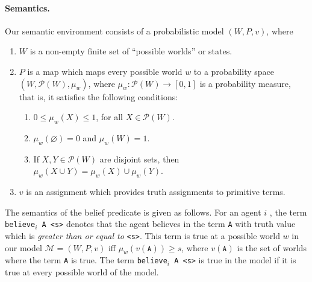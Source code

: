 \documentclass[12pt]{article}
\renewcommand{\emptyset}{\varnothing}
\begin{document}
\paragraph{Semantics.} Our semantic environment consists of a probabilistic model $(W,P,v)$, where 
\begin{enumerate}
\item
$W$ is a non-empty finite set of ``possible worlds'' or states.
\item
$P$ is a map which maps every possible world $w$ to a probability space $(W,\mathcal{P}(W),\mu_{w})$, where $\mu_{w}: \mathcal{P}(W)\to[0,1]$ is a probability measure, that is, it satisfies the following conditions:

\begin{enumerate}
\item
$0\leq \mu_{w}(X)\leq 1$, for all $X\in \mathcal{P}(W)$.
\item
$\mu_{w}(\emptyset)=0$ and $\mu_{w}(W)=1$.
\item
If $X,Y\in \mathcal{P}(W)$ are disjoint sets, then $\mu_{w}(X\cup Y)=\mu_{w}(X)\cup\mu_{w}(Y)$. 
\end{enumerate}
\item
$v$ is an assignment which provides truth assignments to primitive terms. 
\end{enumerate}
The semantics of the belief predicate is given as follows. For an agent $i$ , the term \texttt{believe$_i$ A <s>} denotes that the agent believes in the term \texttt{A} with truth value which is \emph{greater than or equal to} \texttt{<s>}. This term is true at a possible world $w$ in our model $\mathcal{M} = (W,P,v)$ iff $\mu_{w}(v(\texttt{A}))\geq s$, where $v(\texttt{A})$ is the set of worlds where the term \texttt{A} is true. The term \texttt{believe$_i$ A <s>} is true in the model if it is true at every possible world of the model. 
\end{document}
